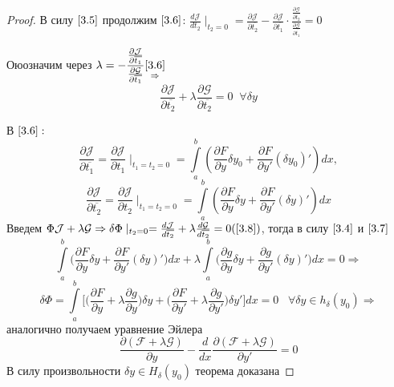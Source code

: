 \begin{proof}
В силу $\ref{3.5}$ продолжим $\ref{3.6}$: $\frac{d\mathcal{J}}{d t_2}\mid_{t_2=0}=\frac{\partial \mathcal{J}}{\partial \overline{t_2}}-\frac{\partial \mathcal{J}}{\partial \overline{t_1}}\cdot \frac{\frac{\partial \mathcal{G}}{\partial \overline{t_2}}}{\frac{\partial \mathcal{G}}{\partial \overline{t_1}}}=0$
\par
Оюозначим через $\lambda = -\dfrac{\frac{\partial\mathcal{J}}{\partial \overline{t_1}}}{\frac{\partial\mathcal{G}}{\partial \overline{t_1}}}\underset{\Rightarrow}{\ref{3.6}}$
\begin{equation}
\label{3.8}
\tag{3.8}
\frac{\partial\mathcal{J}}{\partial\overline{t_2}}+\lambda \frac{\partial\mathcal{G}}{\partial\overline{t_2}}=0\;\;\forall\delta y \end{equation}
\par
В $\ref{3.6}:$
\begin{equation}
    \label{3.7}
    \tag{3.7}
    \frac{\partial\mathcal{J}}{\partial \overline{t_1}}=\frac{\partial \mathcal{J}}{\partial t_1}\mid_{t_1=t_2=0}=\int\limits_a^b(\frac{\partial F}{\partial y}\delta y_0+\frac{\partial F}{\partial y'}(\delta y_0)')d x,
    \end{equation}
    \begin{equation*}
    \frac{\partial\mathcal{J}}{\partial \overline{t_2}}=\frac{\partial \mathcal{J}}{\partial t_2}\mid_{t_1=t_2=0}=\int\limits_a^b(\frac{\partial F}{\partial y}\delta y+\frac{\partial F}{\partial y'}(\delta y)')d x
\end{equation*}
Введем $\Phi \mathcal{J}+\lambda\mathcal{G}\Rightarrow \delta \Phi\mid_{t_2=0}=\frac{d\mathcal{J}}{d\overline{t_2}}+\lambda\frac{d\mathcal{G}}{d\overline{t_2}}=0(\ref{3.8})$, тогда в силу $\ref{3.4}$ и $\ref{3.7}$ $$\int\limits_a^b\Big(\frac{\partial F}{\partial y}\delta y + \frac{\partial F}{\partial y'}(\delta y)'\Big)d x+\lambda\int\limits_a^b\Big(\frac{\partial g}{\partial y}\delta y + \frac{\partial g}{\partial y'}(\delta y)'\Big)d x=0\Rightarrow$$$$ \delta \Phi =\int\limits_a^b\Big[\Big(\frac{\partial F}{\partial y}+ \lambda\frac{\partial g}{\partial y}\Big)\delta y + \Big(\frac{\partial F}{\partial y'}+ \lambda\frac{\partial g}{\partial y'}\Big)\delta y'\Big]dx=0\;\;\;\forall \delta y \in h_\delta(y_0)\Rightarrow$$
аналогично получаем уравнение Эйлера
$$\frac{\partial(\mathcal{F}+\lambda\mathcal{G})}{\partial y}-\frac{d}{dx}\frac{\partial(\mathcal{F}+\lambda\mathcal{G})}{\partial y'}=0$$
В силу произвольности $\delta y\in H_\delta(y_0)$ теорема доказана
\end{proof}

